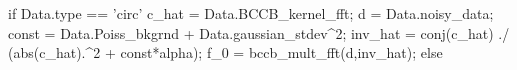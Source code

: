     if Data.type == 'circ'   %
      c_hat = Data.BCCB_kernel_fft;
      d = Data.noisy_data;
      const = Data.Poiss_bkgrnd + Data.gaussian_stdev^2;
      inv_hat = conj(c_hat) ./ (abs(c_hat).^2 + const*alpha);
      f_0 = bccb_mult_fft(d,inv_hat);
    else
